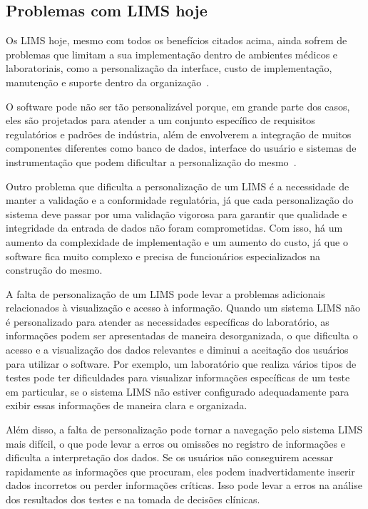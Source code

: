 \subsection{Problemas com LIMS hoje}


Os LIMS hoje, mesmo com todos os benefícios citados acima, ainda sofrem de problemas que limitam a sua implementação dentro de ambientes médicos e laboratoriais, como a personalização da interface, custo de implementação, manutenção e suporte dentro da organização~\cite{Avery2000ProductGuide., 2018CommonAstrix}.

O software pode não ser tão personalizável porque, em grande parte dos casos, eles são projetados para atender a um conjunto específico de requisitos regulatórios e padrões de indústria, além de envolverem a integração de muitos componentes diferentes como banco de dados, interface do usuário e sistemas de instrumentação que podem dificultar a personalização do mesmo~\cite{Tomlinson2022AOperations}.

Outro problema que dificulta a personalização de um LIMS é a necessidade de manter a validação e a conformidade regulatória, já que cada personalização do sistema deve passar por uma validação vigorosa para garantir que qualidade e integridade da entrada de dados não foram comprometidas.
Com isso, há um aumento da complexidade de implementação e um aumento do custo, já que o software fica muito complexo e precisa de funcionários especializados na construção do mesmo.



A falta de personalização de um LIMS pode levar a problemas adicionais relacionados à visualização e acesso à informação. Quando um sistema LIMS não é personalizado para atender as necessidades específicas do laboratório, as informações podem ser apresentadas de maneira desorganizada, o que dificulta o acesso e a visualização dos dados relevantes e diminui a aceitação dos usuários para utilizar o software. Por exemplo, um laboratório que realiza vários tipos de testes pode ter dificuldades para visualizar informações específicas de um teste em particular, se o sistema LIMS não estiver configurado adequadamente para exibir essas informações de maneira clara e organizada.


Além disso, a falta de personalização pode tornar a navegação pelo sistema LIMS mais difícil, o que pode levar a erros ou omissões no registro de informações e dificulta a interpretação dos dados. Se os usuários não conseguirem acessar rapidamente as informações que procuram, eles podem inadvertidamente inserir dados incorretos ou perder informações críticas. Isso pode levar a erros na análise dos resultados dos testes e na tomada de decisões clínicas.

